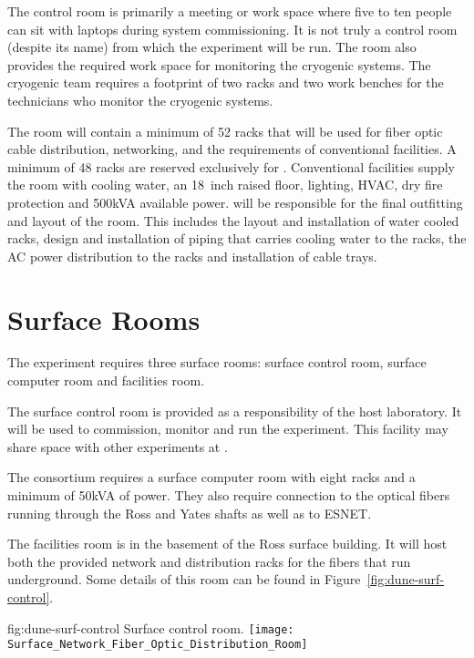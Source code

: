 The control room is primarily a meeting or work space where
five to ten people can sit with laptops during system commissioning.
It is not truly a control room (despite its name) from which the
experiment will be run.  The room also provides the required work space for
monitoring the cryogenic systems.  The cryogenic team requires a
footprint of two racks and two work benches for the technicians who monitor the cryogenic systems.
       
The  room will contain a minimum of 52 racks that will be
used for fiber optic cable distribution, networking, 
 and the requirements of conventional facilities.  A
minimum of 48 racks are reserved exclusively for .
Conventional facilities supply the  room with cooling
water, an 18~inch raised floor, lighting, HVAC, dry fire protection
and 500kVA available power.   will be responsible for
the final outfitting and layout of the room.  This includes the layout
and installation of water cooled racks, design and installation of
piping that carries cooling water to the racks, the AC power
distribution to the racks and installation of cable trays.


\section{Surface Rooms}
\label{sec:fdsp-coord-surf-rooms}


The  experiment requires three surface rooms: surface
control room,  surface computer room and  facilities room.


The  surface control room is provided as a responsibility of the host laboratory.  It will be used to commission, monitor and run the
experiment.  This facility may share space with
other experiments at \surf.

The  consortium requires a surface computer room with eight
racks and a minimum of 50kVA of power.  They also require connection
to the optical fibers running through the Ross and Yates shafts as
well as to ESNET.


The facilities room is in the basement of the Ross surface
building.  It will host both the \fnal provided network and
distribution racks for the fibers that run underground. Some details
of this room can be found in Figure~\ref{fig:dune-surf-control}.
\begin{dunefigure}{fig:dune-surf-control}
  {Surface control room.}
  \texttt{[image: Surface\_Network\_Fiber\_Optic\_Distribution\_Room]}
\end{dunefigure}


